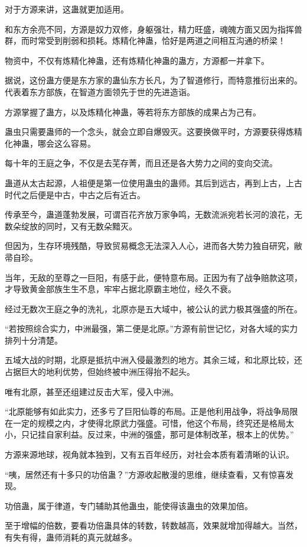 \begin{this_body}
对于方源来讲，这蛊就更加适用。

和东方余亮不同，方源是奴力双修，身躯强壮，精力旺盛，魂魄方面又因为指挥兽群，而时常受到削弱和损耗。炼精化神蛊，恰好是两道之间相互沟通的桥梁！

物资中，不仅有炼精化神蛊，还有炼精化神蛊的蛊方，方源都一并拿下。

据说，这份蛊方便是东方家的蛊仙东方长凡，为了智道修行，而特意推衍出来的。代表着东方部族，在智道方面领先于世的先进造诣。

方源掌握了蛊方，以及炼精化神蛊，等若将东方部族的成果占为己有。

蛊虫只需要蛊师的一个念头，就会立即自爆毁灭。这要换做平时，方源要获得炼精化神蛊，哪会这么容易。

每十年的王庭之争，不仅是去芜存菁，而且还是各大势力之间的变向交流。

蛊道从太古起源，人祖便是第一位使用蛊虫的蛊师。其后到远古，再到上古，上古时代之后便是中古，中古之后有近古。

传承至今，蛊道蓬勃发展，可谓百花齐放万家争鸣，无数流派宛若长河的浪花，无数朵绽放的同时，又有无数朵黯灭。

但因为，生存环境残酷，导致贸易概念无法深入人心，进而各大势力独自研究，敝帚自珍。

当年，无敌的至尊之一巨阳，有感于此，便特意布局。正因为有了战争赔款这项，才导致黄金部族生生不息，牢牢占据北原霸主地位，经久不衰。

经过无数次王庭之争的洗礼，北原亦是五大域中，被公认的武力极其强盛的所在。

“若按照综合实力，中洲最强，第二便是北原。”方源有前世记忆，对各大域的实力排列十分清楚。

五域大战的时期，北原是抵抗中洲入侵最激烈的地方。其余三域，和北原比较，还占据巨大的地利优势，但始终被中洲压得抬不起头。

唯有北原，甚至还组建过反击大军，侵入中洲。

“北原能够有如此实力，还多亏了巨阳仙尊的布局。正是他利用战争，将战争局限在一定的规模之内，才使得北原武力强盛。可惜，他这个布局，终究还是格局太小，只记挂自家利益。反过来，中洲的强盛，那可是体制改革，根本上的优势。”

方源来源地球，视角就本独到，又有五百年经历，对社会本质有着清晰的认识。

“咦，居然还有十多只的功倍蛊？”方源收起散漫的思维，继续查看，又有惊喜发现。

功倍蛊，属于律道，专门辅助其他蛊虫，能使得该蛊虫的效果加倍。

至于增幅的倍数，要看功倍蛊具体的转数，转数越高，效果就增加得越大。当然，有失有得，蛊师消耗的真元就越多。


\end{this_body}
